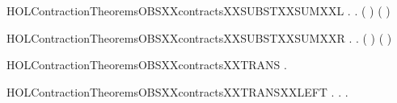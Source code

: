 \newcommand{\HOLContractionTheoremsOBSXXcontractsXXSUBSTXXRESTR}{\UseVerbatim{HOLContractionTheoremsOBSXXcontractsXXSUBSTXXRESTR}}
\begin{SaveVerbatim}{HOLContractionTheoremsOBSXXcontractsXXSUBSTXXSUMXXL}
\HOLTokenTurnstile{} \HOLSymConst{\HOLTokenForall{}} .
          \HOLSymConst{\HOLTokenImp{}}
       \HOLSymConst{\HOLTokenForall{}}.  ( \HOLSymConst{+} ) ( \HOLSymConst{+} )
\end{SaveVerbatim}
\newcommand{\HOLContractionTheoremsOBSXXcontractsXXSUBSTXXSUMXXL}{\UseVerbatim{HOLContractionTheoremsOBSXXcontractsXXSUBSTXXSUMXXL}}
\begin{SaveVerbatim}{HOLContractionTheoremsOBSXXcontractsXXSUBSTXXSUMXXR}
\HOLTokenTurnstile{} \HOLSymConst{\HOLTokenForall{}} .
          \HOLSymConst{\HOLTokenImp{}}
       \HOLSymConst{\HOLTokenForall{}}.  ( \HOLSymConst{+} ) ( \HOLSymConst{+} )
\end{SaveVerbatim}
\newcommand{\HOLContractionTheoremsOBSXXcontractsXXSUBSTXXSUMXXR}{\UseVerbatim{HOLContractionTheoremsOBSXXcontractsXXSUBSTXXSUMXXR}}
\begin{SaveVerbatim}{HOLContractionTheoremsOBSXXcontractsXXTRANS}
\HOLTokenTurnstile{} \HOLSymConst{\HOLTokenForall{}}  .
          \HOLSymConst{\HOLTokenConj{}}    \HOLSymConst{\HOLTokenImp{}}
         
\end{SaveVerbatim}
\newcommand{\HOLContractionTheoremsOBSXXcontractsXXTRANS}{\UseVerbatim{HOLContractionTheoremsOBSXXcontractsXXTRANS}}
\begin{SaveVerbatim}{HOLContractionTheoremsOBSXXcontractsXXTRANSXXLEFT}
\HOLTokenTurnstile{} \HOLSymConst{\HOLTokenForall{}} .
          \HOLSymConst{\HOLTokenImp{}}
       \HOLSymConst{\HOLTokenForall{}} .  \HOLTokenTransBegin{}\HOLTokenTransEnd {} \HOLSymConst{\HOLTokenImp{}} \HOLSymConst{\HOLTokenExists{}}.  \HOLTokenTransBegin{}\HOLTokenTransEnd {} \HOLSymConst{\HOLTokenConj{}}   
\end{SaveVerbatim}
